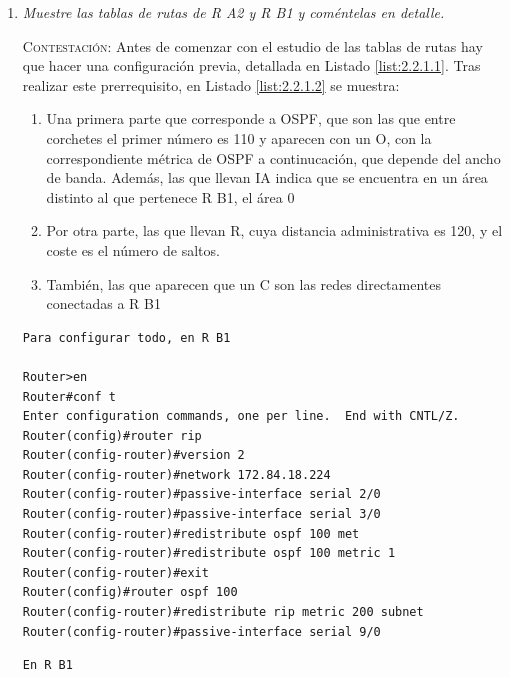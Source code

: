 \documentclass[twoside, 11pt]{article}
\begin{document}
\begin{enumerate}
    \item \textit{Muestre las tablas de rutas de R A2 y R B1 y coméntelas en detalle.}
    \label{ej:2.2.1}

    \vspace{7px}

    \textsc{Contestación}: Antes de comenzar con el estudio de las tablas de rutas hay que hacer una configuración previa, detallada en Listado \ref{list:2.2.1.1}. Tras realizar este prerrequisito, en Listado \ref{list:2.2.1.2} se muestra:
    \begin{enumerate}
        \item Una primera parte que corresponde a OSPF, que son las que entre corchetes el primer número es 110 y aparecen con un O, con la correspondiente métrica de OSPF a continucación, que depende del ancho de banda. Además, las que llevan IA indica que se encuentra en un área distinto al que pertenece R B1, el área 0
        \item Por otra parte, las que llevan R, cuya distancia administrativa es 120, y el coste es el número de saltos.
        \item También, las que aparecen que un C son las redes directamentes conectadas a R B1
    \end{enumerate}

\begin{center}
\begin{verbatim}
Para configurar todo, en R B1

Router>en
Router#conf t
Enter configuration commands, one per line.  End with CNTL/Z.
Router(config)#router rip
Router(config-router)#version 2
Router(config-router)#network 172.84.18.224
Router(config-router)#passive-interface serial 2/0
Router(config-router)#passive-interface serial 3/0
Router(config-router)#redistribute ospf 100 met
Router(config-router)#redistribute ospf 100 metric 1
Router(config-router)#exit
Router(config)#router ospf 100
Router(config-router)#redistribute rip metric 200 subnet
Router(config-router)#passive-interface serial 9/0
\end{verbatim}
\label{list:2.2.1.1}

\begin{verbatim}
En R B1


\end{verbatim}
\end{center}
\end{enumerate}
\end{document}
